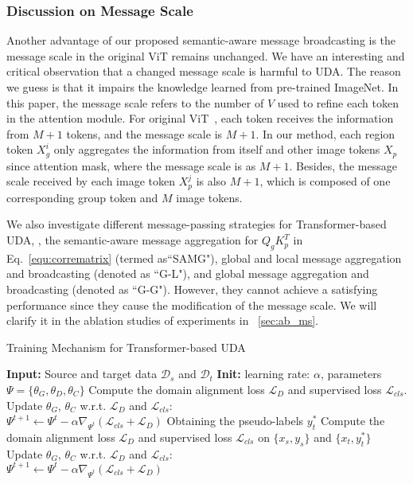 \documentclass[journal]{IEEEtran}
\begin{document}
\subsubsection{Discussion on Message Scale}
\label{sec:ms}
Another advantage of our proposed semantic-aware message broadcasting is the message scale in the original ViT remains unchanged. We have an interesting and critical observation that a changed message scale is harmful to UDA. The reason we guess is that it impairs the knowledge learned from pre-trained ImageNet. In this paper, the message scale refers to the number of $V$ used to refine each token in the attention module. For original ViT~\cite{dosovitskiy2020imageViT}, each token receives the information from $M+1$ tokens, and the message scale is $M+1$. In our method, each region token $X_g^i$ only aggregates the information from itself and other image tokens $X_p$ since attention mask, where the message scale is as $M+1$. Besides, the message scale received by each image token $X_p^j$ is also $M+1$, which is composed of one corresponding group token and $M$ image tokens. 

We also investigate different message-passing strategies for Transformer-based UDA, \ieno, the semantic-aware message aggregation for $Q_gK_p^T$ in Eq.~\ref{equ:corrematrix} (termed as``SAMG"), global and local message aggregation and broadcasting (denoted as ``G-L"), and global message aggregation and broadcasting (denoted as ``G-G"). However, they cannot achieve a satisfying performance since they cause the modification of the message scale. We will clarify it in the ablation studies of experiments in ~\ref{sec:ab_ms}.  
 \begin{algorithm}[t]
\caption{Training Mechanism for Transformer-based UDA}
\label{alg: training}
\begin{algorithmic}[1]
\State \textbf{Input:} Source and target data $\mathcal{D}_s$ and $\mathcal{D}_t$ 
\State \textbf{Init:} learning rate: $\alpha$, parameters $\Psi=\{ \theta_G,\theta_D,\theta_C\}$
\State Compute the domain alignment loss $\mathcal{L}_D$ and supervised loss $\mathcal{L}_{cls}$.
\State  Update $\theta_G$, $\theta_C$ w.r.t. $\mathcal{L}_D$ and $\mathcal{L}_{cls}$: \\
    \quad \quad \quad         $\Psi^{t+1} \xleftarrow{} \Psi^t - \alpha \nabla_{\Psi^t}(\mathcal{L}_{cls}+\mathcal{L}_D)$
\EndFor 
{}
\State Obtaining the pseudo-labels $y_t^*$ 
\State 
Compute the domain alignment loss $\mathcal{L}_D$ and supervised loss $\mathcal{L}_{cls}$ on $\{x_s, y_s\}$ and $\{x_t, y_t^*\}$
\State  Update $\theta_G$, $\theta_C$ w.r.t. $\mathcal{L}_D$ and $\mathcal{L}_{cls}$: \\
    \quad \quad \quad         $\Psi^{t+1} \xleftarrow{} \Psi^t - \alpha \nabla_{\Psi^t}(\mathcal{L}_{cls}+\mathcal{L}_D)$
\EndFor 
\end{algorithmic}
\end{algorithm}
\end{document}

